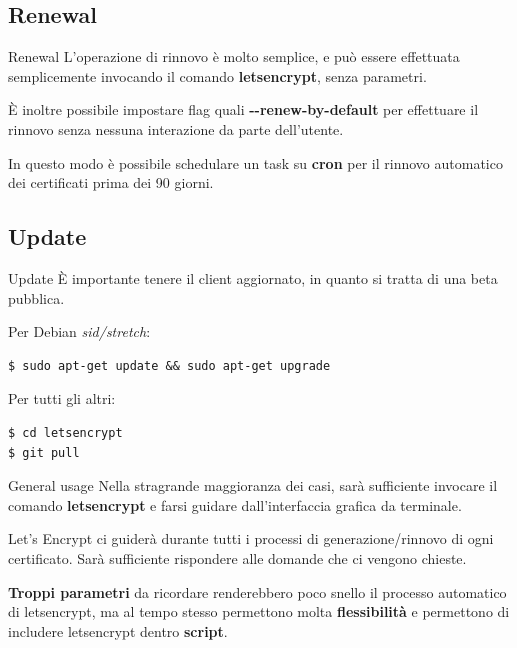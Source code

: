 \documentclass[xcolor=svgnames,11pt]{beamer}
\begin{document}
\subsection{Renewal}
\begin{frame}[fragile]{Renewal}
L'operazione di rinnovo è molto semplice, e può essere effettuata semplicemente
invocando il comando \textbf{letsencrypt}, senza parametri.

\medskip\pause

È inoltre possibile impostare flag quali \textbf{-{}-renew-by-default} per effettuare
il rinnovo senza nessuna interazione da parte dell'utente.

\medskip\pause

In questo modo è possibile schedulare un task su \textbf{cron} per il rinnovo
automatico dei certificati prima dei 90 giorni.

\end{frame}

\subsection{Update}
\begin{frame}[fragile]{Update}
È importante tenere il client aggiornato, in quanto si tratta di una beta pubblica.


\medskip\pause
Per Debian \emph{sid/stretch}:
\begin{block}{}
\begin{scriptsize}
\begin{verbatim}
$ sudo apt-get update && sudo apt-get upgrade
\end{verbatim}
\end{scriptsize}
\end{block}

\medskip\pause
Per tutti gli altri:
\begin{block}{}
\begin{scriptsize}
\begin{verbatim}
$ cd letsencrypt
$ git pull
\end{verbatim}
\end{scriptsize}
\end{block}

\end{frame}

\begin{frame}[fragile]{General usage}
Nella stragrande maggioranza dei casi, sarà sufficiente invocare il comando
\textbf{letsencrypt} e farsi guidare dall'interfaccia grafica da terminale.

\medskip\pause

Let's Encrypt ci guiderà durante tutti i processi di generazione/rinnovo
di ogni certificato. Sarà sufficiente rispondere alle domande che ci vengono
chieste.

\medskip\pause

\textbf{Troppi parametri} da ricordare renderebbero poco snello il processo automatico
di letsencrypt, ma al tempo stesso permettono molta \textbf{flessibilità} e permettono
di includere letsencrypt dentro \textbf{script}.

\end{frame}
\end{document}
